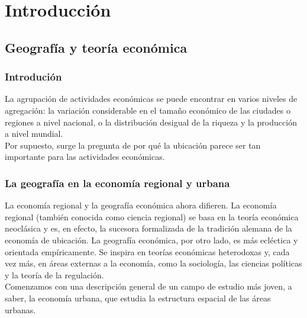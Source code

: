 \part{Introducción}

\chapter{Geografía y teoría económica}

\section{Introdución}

    La agrupación de actividades económicas se puede encontrar en varios niveles de agregación: la variación considerable en el tamaño económico de las ciudades o regiones a nivel nacional, o la distribución desigual de la riqueza y la producción a nivel mundial.\\
    Por supuesto, surge la pregunta de por qué la ubicación parece ser tan importante para las actividades económicas.

\section{La geografía en la economía regional y urbana}
La economía regional y la geografía económica ahora difieren. La economía regional (también conocida como ciencia regional) se basa en la teoría económica neoclásica y es, en efecto, la sucesora formalizada de la tradición alemana de la economía de ubicación. La geografía económica, por otro lado, es más ecléctica y orientada empíricamente. Se inspira en teorías económicas heterodoxas y, cada vez más, en áreas externas a la economía, como la sociología, las ciencias políticas y la teoría de la regulación.\\
Comenzamos con una descripción general de un campo de estudio más joven, a saber, la economía urbana, que estudia la estructura espacial de las áreas urbanas.

